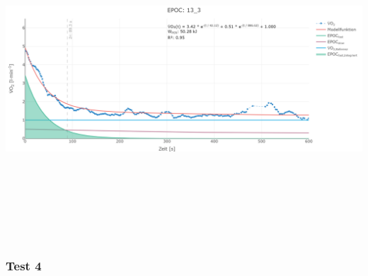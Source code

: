 \documentclass[
  letterpaper,
  DIV=11]{scrartcl}
\begin{document}
\includegraphics[width=11.45833in,height=4.6875in]{images/13_3.png}

\subsubsection{Test 4}
\end{document}
